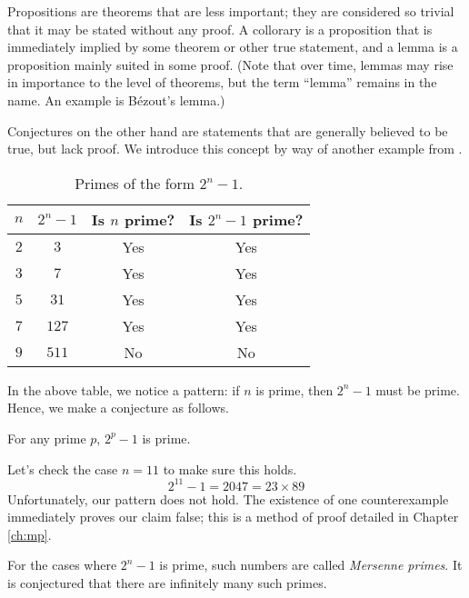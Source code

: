 Propositions are theorems that are less important; they are considered so trivial that it may be stated
without any proof. A collorary is a proposition that is immediately implied by some theorem or other true
statement, and a lemma is a proposition mainly suited in some proof. (Note that over time, lemmas may
rise in importance to the level of theorems, but the term ``lemma'' remains in the name. An example is
B\'{e}zout's lemma.)

Conjectures on the other hand are statements that are generally believed to be true, but lack proof. We introduce
this concept by way of another example from \cite{Velleman_2019}.

\begin{table}[h]
    \centering
    \begin{tabular}{|c|c|c|c|}
        \hline
        $n$ & $2^n - 1$ & Is $n$ prime? & Is $2^n - 1$ prime? \\ \hline
        $2$ & $3$       & Yes           & Yes                 \\ \hline
        $3$ & $7$       & Yes           & Yes                 \\ \hline
        $5$ & $31$      & Yes           & Yes                 \\ \hline
        $7$ & $127$     & Yes           & Yes                 \\ \hline
        $9$ & $511$     & No            & No                  \\ \hline
    \end{tabular}
    \caption{Primes of the form $2^n - 1$.}
    \label{tab:mersenne-test}
\end{table}

In the above table, we notice a pattern: if $n$ is prime, then $2^n - 1$ must be prime. Hence, we make a conjecture as
follows.

\begin{conjecture}
    For any prime $p$, $2^p - 1$ is prime.
\end{conjecture}

Let's check the
case $n = 11$ to make sure this holds.
\[
2^{11} - 1 = 2047 = 23 \times 89
\]
Unfortunately, our pattern does not hold. The existence of one counterexample immediately proves our claim false;
this is a method of proof detailed in Chapter \ref{ch:mp}.

For the cases where $2^n - 1$ is prime, such numbers are called
\textit{Mersenne primes}. It is conjectured that there are infinitely many such primes.

